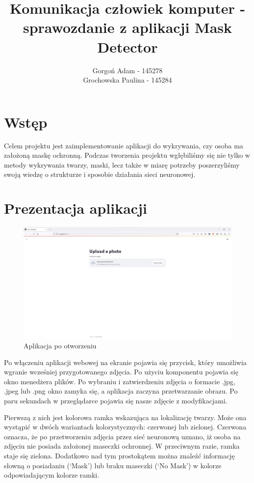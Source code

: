 \documentclass[12pt]{article}
\title{Komunikacja człowiek komputer - sprawozdanie z aplikacji Mask Detector}
\author{Gorgoń Adam - 145278\\Grochowska Paulina - 145284}
\begin{document}
	\maketitle
	
	\section{Wstęp}
	Celem projektu jest zaimplementowanie aplikacji do wykrywania, czy osoba ma założoną maskę ochronną. Podczas tworzenia projektu wgłębiliśmy się nie tylko w metody wykrywania twarzy, maski, lecz także w miarę potrzeby poszerzyliśmy swoją wiedzę o strukturze i sposobie działania sieci neuronowej.
	\section{Prezentacja aplikacji}
	\begin{figure}
		\centering
		\includegraphics[width=\textwidth]{apka.png}
		\caption{Aplikacja po otworzeniu}
		\label{fig:apka}
	\end{figure}
	Po włączeniu aplikacji webowej na ekranie pojawia się przycisk, który umożliwia wgranie wcześniej przygotowanego zdjęcia. Po użyciu komponentu pojawia się okno menedżera plików. Po wybraniu i zatwierdzeniu zdjęcia o formacie .jpg, .jpeg lub .png okno zamyka się, a aplikacja zaczyna przetwarzanie obrazu. Po paru sekundach w przeglądarce pojawia się nasze zdjęcie z modyfikacjami.
	
	Pierwszą z nich jest kolorowa ramka wskazująca na lokalizację twarzy. Może ona wystąpić w dwóch wariantach kolorystycznych: czerwonej lub zielonej. Czerwona oznacza, że po przetworzeniu zdjęcia przez sieć neuronową uznano, iż osoba na zdjęciu nie posiada założonej maseczki ochronnej. W przeciwnym razie, ramka staje się zielona. Dodatkowo nad tym prostokątem można znaleźć informację słowną o posiadaniu (‘Mask’) lub braku maseczki (‘No Mask’) w kolorze odpowiadającym kolorze ramki.
	
\end{document}
